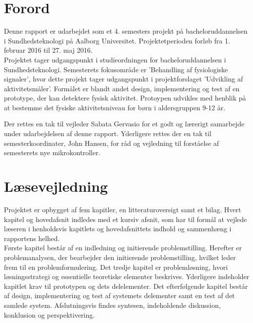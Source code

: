 \section*{Forord}
Denne rapport er udarbejdet som et 4. semesters projekt på bacheloruddannelsen i Sundhedsteknologi på Aalborg Universitet. Projektetperioden forløb fra 1. februar 2016 til 27. maj 2016. \\
Projektet tager udgangspunkt i studieordningen for bacheloruddannelsen i Sundhedsteknologi. Semesterets fokusområde er 'Behandling af fysiologiske signaler', hvor dette projekt tager udgangspunkt i projektforslaget 'Udvikling af aktivitetsmåler'. Formålet er blandt andet design, implementering og test af en prototype, der kan detektere fysisk aktivitet. Protoypen udvikles med henblik på at bestemme det fysiske aktivitetsniveau for børn i aldersgruppen 9-12 år. %

Der rettes en tak til vejleder Sabata Gervasio for et godt og lærerigt samarbejde under udarbejdelsen af denne rapport. Yderligere rettes der en tak til semesterkoordinater, John Hansen, for råd og vejledning til forståelse af semesterets nye mikrokontroller. 

\section*{Læsevejledning}
Projektet er opbygget af fem kapitler, en litteraturoversigt samt et bilag. Hvert kapitel og hovedafsnit indledes med et kursiv afsnit, som har til formål at vejlede læseren i henholdsvis kapitlets og hovedafsnittets indhold og sammenhæng i rapportens helhed.\\
Første kapitel består af en indledning og initierende problemstilling. Herefter er problemanalysen, der bearbejder den initierende problemstilling, hvilket leder frem til en problemformulering. Det tredje kapitel er problemløsning, hvori løsningsstrategi og essentielle teoretiske elementer beskrives. Yderligere indeholder kapitlet krav til prototypen og dets delelementer. Det efterfølgende kapitel består af design, implementering og test af systemets delementer samt en test af det samlede system. Afslutningsvis findes syntesen, indeholdende diskussion, konklusion og perspektivering.

